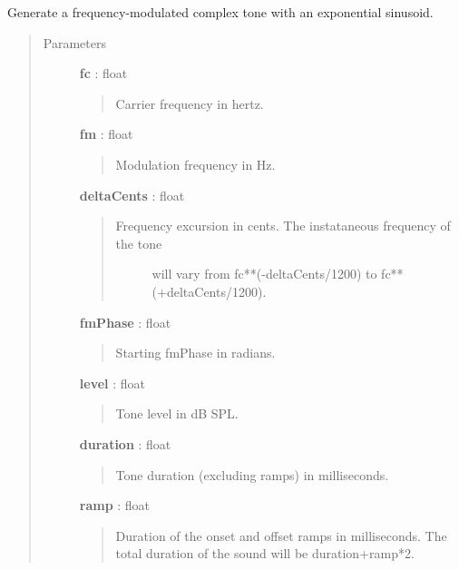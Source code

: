 \documentclass[a4paper,12pt,english]{sphinxmanual}
\begin{document}

\begin{fulllineitems}
\label{sndlib:sndlib.expSinFMComplex}
Generate a frequency-modulated complex tone with an exponential sinusoid.
\begin{quote}\begin{description}
\item[{Parameters }] \leavevmode
\textbf{fc} : float
\begin{quote}

Carrier frequency in hertz.
\end{quote}

\textbf{fm} : float
\begin{quote}

Modulation frequency in Hz.
\end{quote}

\textbf{deltaCents} : float
\begin{quote}
\begin{description}
\item[{Frequency excursion in cents. The instataneous frequency of the tone}] \leavevmode
will vary from fc**(-deltaCents/1200) to fc**(+deltaCents/1200).

\end{description}
\end{quote}

\textbf{fmPhase} : float
\begin{quote}

Starting fmPhase in radians.
\end{quote}

\textbf{level} : float
\begin{quote}

Tone level in dB SPL.
\end{quote}

\textbf{duration} : float
\begin{quote}

Tone duration (excluding ramps) in milliseconds.
\end{quote}

\textbf{ramp} : float
\begin{quote}

Duration of the onset and offset ramps in milliseconds.
The total duration of the sound will be duration+ramp*2.
\end{quote}


\end{description}
\end{quote}
\end{fulllineitems}
\end{document}
